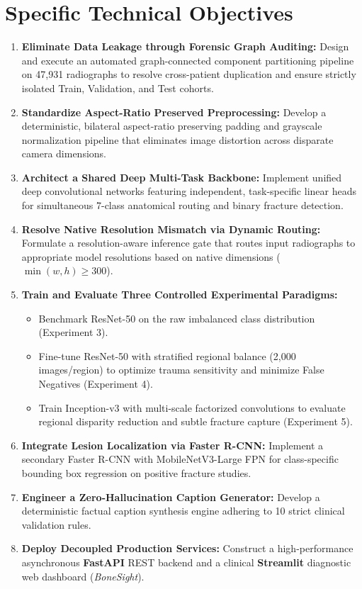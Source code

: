 \documentclass[12pt, a4paper]{report}
\begin{document}
\section{Specific Technical Objectives}
\begin{enumerate}[leftmargin=*]
    \item \textbf{Eliminate Data Leakage through Forensic Graph Auditing:} Design and execute an automated graph-connected component partitioning pipeline on 47,931 radiographs to resolve cross-patient duplication and ensure strictly isolated Train, Validation, and Test cohorts.
    \item \textbf{Standardize Aspect-Ratio Preserved Preprocessing:} Develop a deterministic, bilateral aspect-ratio preserving padding and grayscale normalization pipeline that eliminates image distortion across disparate camera dimensions.
    \item \textbf{Architect a Shared Deep Multi-Task Backbone:} Implement unified deep convolutional networks featuring independent, task-specific linear heads for simultaneous 7-class anatomical routing and binary fracture detection.
    \item \textbf{Resolve Native Resolution Mismatch via Dynamic Routing:} Formulate a resolution-aware inference gate that routes input radiographs to appropriate model resolutions based on native dimensions ($\min(w,h) \ge 300$).
    \item \textbf{Train and Evaluate Three Controlled Experimental Paradigms:}
    \begin{itemize}
        \item Benchmark ResNet-50 on the raw imbalanced class distribution (Experiment 3).
        \item Fine-tune ResNet-50 with stratified regional balance (2,000 images/region) to optimize trauma sensitivity and minimize False Negatives (Experiment 4).
        \item Train Inception-v3 with multi-scale factorized convolutions to evaluate regional disparity reduction and subtle fracture capture (Experiment 5).
    \end{itemize}
    \item \textbf{Integrate Lesion Localization via Faster R-CNN:} Implement a secondary Faster R-CNN with MobileNetV3-Large FPN for class-specific bounding box regression on positive fracture studies.
    \item \textbf{Engineer a Zero-Hallucination Caption Generator:} Develop a deterministic factual caption synthesis engine adhering to 10 strict clinical validation rules.
    \item \textbf{Deploy Decoupled Production Services:} Construct a high-performance asynchronous \textbf{FastAPI} REST backend and a clinical \textbf{Streamlit} diagnostic web dashboard (\textit{BoneSight}).
\end{enumerate}
\end{document}
